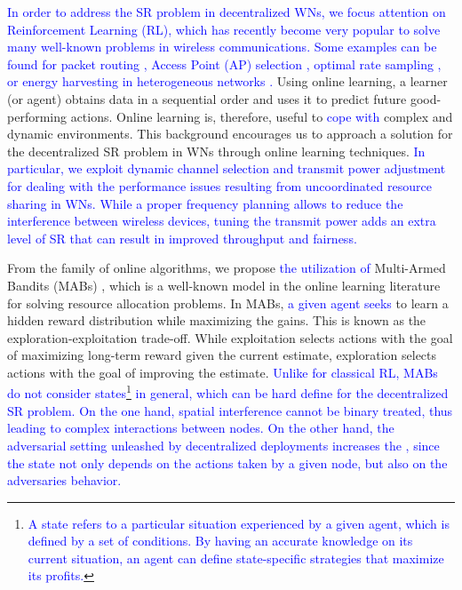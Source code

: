 \documentclass[10pt,journal,compsoc]{IEEEtran}
\newcommand{\francesc}[1]{\textcolor{blue}{#1}}
\begin{document}
	\francesc{In order to address the SR problem in decentralized WNs, we focus attention on Reinforcement Learning (RL), which has recently become very popular to solve many well-known problems in wireless communications. Some examples can be found for packet routing \cite{littman1993distributed}, Access Point (AP) selection \cite{bojovic2011supervised, bojovic2012neural}, optimal rate sampling \cite{combes2014optimal}, or energy harvesting in heterogeneous networks \cite{miozzo2015distributed}.} Using online learning, a learner (or agent) obtains data in a sequential order and uses it to predict future good-performing actions. Online learning is, therefore, useful to \francesc{cope with} complex and dynamic environments. This background encourages us to approach a solution for the decentralized SR problem in WNs through online learning techniques. \francesc{In particular, we exploit dynamic \francesc{channel selection} and transmit power adjustment \francesc{for dealing} with the performance issues resulting from uncoordinated resource sharing in WNs. While a proper frequency planning allows to reduce the interference between wireless devices, tuning the transmit power adds an extra level of SR that can result in improved throughput and fairness.}
	
	From the family of online algorithms, we propose \francesc{the utilization of} Multi-Armed Bandits (MABs) \cite{BCB12}, which is a well-known model in the online learning literature for solving resource allocation problems. In MABs, \francesc{a given agent seeks} to learn a hidden reward distribution while maximizing the gains. This is known as the exploration-exploitation trade-off. %
	While exploitation selects actions with the goal of maximizing long-term reward given the current estimate, exploration selects actions with the goal of improving the estimate. \francesc{Unlike for classical RL, MABs do not consider states\footnote{\francesc{A state refers to a particular situation experienced by a given agent, which is defined by a set of conditions. By having an accurate knowledge on its current situation, an agent can define state-specific strategies that maximize its profits.}} in general, which can be hard define for the decentralized SR problem. On the one hand, spatial interference cannot be binary treated, thus leading to complex interactions between nodes. On the other hand, the adversarial setting unleashed by decentralized deployments increases the , since the state not only depends on the actions taken by a given node, but also on the adversaries behavior.}
	
\end{document}
